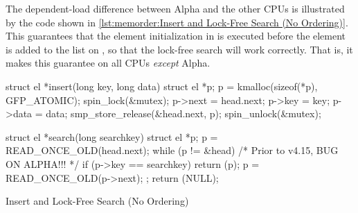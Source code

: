 \begin{fcvref}
The dependent-load difference between Alpha and the other CPUs is
illustrated by the code shown in
\cref{lst:memorder:Insert and Lock-Free Search (No Ordering)}.
This 
guarantees that the element initialization
in  is executed before the element is added to the
list on , so that the lock-free search will work correctly.
That is, it makes this guarantee on all CPUs {\em except} Alpha.
\end{fcvref}

\begin{listing}[tbp]
\begin{fcvlabel}
\begin{VerbatimL}[commandchars=\\\[\]]
struct el *insert(long key, long data)
{
	struct el *p;
	p = kmalloc(sizeof(*p), GFP_ATOMIC);
	spin_lock(&mutex);
	p->next = head.next;		\lnlbl[init:b]
	p->key = key;
	p->data = data;			\lnlbl[init:e]
	smp_store_release(&head.next, p); \lnlbl[add]
	spin_unlock(&mutex);
}

struct el *search(long searchkey)
{
	struct el *p;
	p = READ_ONCE_OLD(head.next);	\lnlbl[h:next]
	while (p != &head) {
		/* Prior to v4.15, BUG ON ALPHA!!! */ \lnlbl[BUG]
		if (p->key == searchkey) {	\lnlbl[key]
			return (p);
		}
		p = READ_ONCE_OLD(p->next);	\lnlbl[next]
	};
	return (NULL);
}
\end{VerbatimL}
\end{fcvlabel}
\caption{Insert and Lock-Free Search (No Ordering)}
\label{lst:memorder:Insert and Lock-Free Search (No Ordering)}
\end{listing}

